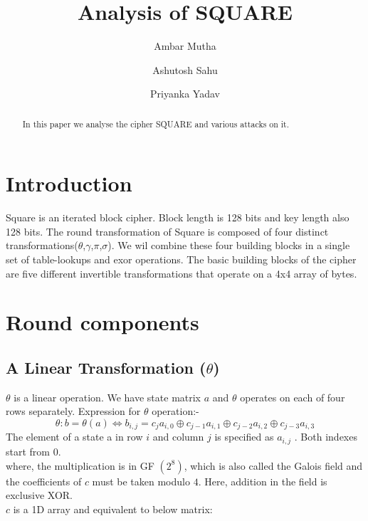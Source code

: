\documentclass[preprint]{transcrypto}
\author{Ambar Mutha \and Ashutosh Sahu \and Priyanka Yadav}
\institute{
  IIT Bhilai, Raipur, India, \email[ambarm@iitbhilai.ac.in,ashutoshsahu@iitbhilai.ac.in,priyankay@iitbhilai.ac.in]{{ambarm,ashutoshsahu,priyankay}@iitbhilai.ac.in}
}
\title{Analysis of SQUARE}
\begin{document}
\maketitle




\begin{abstract}
  In this paper we analyse the cipher SQUARE and various attacks on it.

\end{abstract}



\section{Introduction}

Square is an iterated block cipher. Block length is 128 bits and key length also 128 bits. The round transformation of Square is composed of four distinct transformations($\theta$,$\gamma$,$\pi$,$\sigma$). We wil combine these four building blocks in a single set of table-lookups and exor operations. The basic building blocks of the cipher are five different invertible transformations that operate on a 4x4 array of bytes.

\section{Round components}
\subsection{A Linear Transformation ($\theta$)}
$\theta$ is a linear operation. We have state matrix $a$ and $\theta$ operates on each of four rows separately. Expression for $\theta$ operation:-
$$
  \theta: b=\theta(a) \Leftrightarrow b_{i, j}=c_{j} a_{i, 0} \oplus c_{j-1} a_{i, 1} \oplus c_{j-2} a_{i, 2} \oplus c_{j-3} a_{i, 3}
$$
The element of a state a in row $i$ and column $j$ is specified as $a_{i, j}$ . Both indexes start from $0$.\\
where, the multiplication is in GF $\left(2^{8}\right)$, which is also called the Galois field and the coefficients of $c$ must be taken modulo $4 .$ Here, addition in the field is exclusive XOR.\\
$c$ is a 1D array and equivalent to below matrix:
\end{document}
